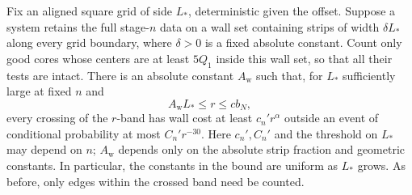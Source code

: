 \begin{proposition}
\label{screen:walls}
Fix an aligned square grid of side $L_*$, deterministic given the
offset. Suppose a system retains the full stage-$n$ data on a wall
set containing strips of width $\delta L_*$ along every grid boundary,
where $\delta>0$ is a fixed absolute constant. Count only good cores
whose centers are at least $5Q_1$ inside this wall set, so that all
their tests are intact. There is an absolute constant $A_{\mathrm w}$
such that, for $L_*$ sufficiently large at fixed $n$ and
\[
 A_{\mathrm w}L_*\leq r\leq c b_N,
\]
every crossing of the $r$-band has wall cost at least $c_n'r^\alpha$
outside an event of conditional probability at most $C_n'r^{-30}$.
Here $c_n',C_n'$ and the threshold on $L_*$ may depend on $n$;
$A_{\mathrm w}$ depends only on the absolute strip fraction and
geometric constants. In particular, the constants in the bound are
uniform as $L_*$ grows. As before, only edges within the crossed band
need be counted.
\end{proposition}

